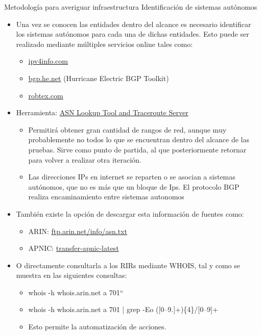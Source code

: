 \documentclass[aspectratio=169,11pt]{beamer}
\begin{document}
\begin{frame}[allowframebreaks]{Metodología para averiguar infraestructura}
\small
Identificación de sistemas autónomos
  \begin{itemize}
  \item Una vez se conocen las entidades dentro del alcance es necesario identificar los sistemas autónomos para cada una de dichas entidades. Esto puede ser realizado mediante múltiples servicios online tales como:
    \begin{itemize}
  \item \href{http://ipv4info.com/}{ipv4info.com}
  \item \href{https://bgp.he.net/}{bgp.he.net} (Hurricane Electric BGP Toolkit)
  \item \href{https://www.robtex.com/}{robtex.com}
    \end{itemize}

  \item Herramienta: \href{https://bgp.he.net/}{ASN Lookup Tool and Traceroute Server}
      \begin{itemize}
  \item Permitirá obtener gran cantidad de rangos de red, aunque muy probablemente no todos lo que se encuentran dentro del alcance de las pruebas. Sirve como punto de partida, al que posteriormente retornar para volver a realizar otra iteración.
  \item Las direcciones IPs en internet se reparten o se asocian a sistemas autónomos, que no es más que un bloque de Ips. El protocolo BGP realiza encaminamiento entre sistemas autonomos
      \end{itemize}

  \item También existe la opción de descargar esta información de fuentes como:
      \begin{itemize}
  \item ARIN: \href{https://ftp.arin.net/info/asn.txt}{ftp.arin.net/info/asn.txt}
  \item APNIC: \href{https://ftp.apnic.net/transfers/apnic/transfer-apnic-latest}{transfer-apnic-latest}
       \end{itemize}

  \item O directamente consultarla a los RIRs mediante WHOIS, tal y como se muestra en las siguientes consultas:
       \begin{itemize}
  \item whois -h whois.arin.net \textquotedbl{}a 701``
  \item whois -h whois.arin.net \textquotedbl{}a 701\textquotedbl{} | grep -Eo \textquotedbl{}([0--9.]+)\{4\}/[0--9]+\textquotedbl{}
  \item Esto permite la automatización de acciones.
       \end{itemize}

\end{itemize}
\end{frame}
\end{document}
